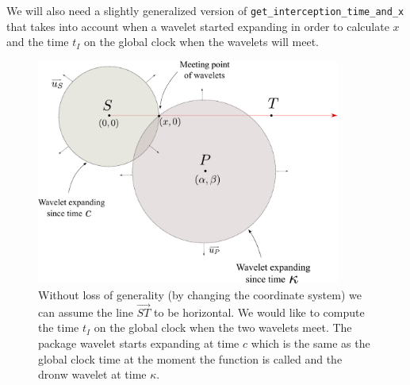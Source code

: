 \documentclass[10pt, english, oneside]{report}
\begin{document}
We will also need a slightly generalized version of \verb|get_interception_time_and_x| that takes into
account when a wavelet started expanding in order to calculate $x$ and the time $t_I$ on the global clock
when the wavelets will meet. 


\begin{figure}[H]
\centering
\includegraphics[width=10cm]{docs/get_interception_time_and_x_generalized.pdf}
\caption{Without loss of generality (by changing the coordinate system) we can assume 
         the line $\vec{ST}$ to be horizontal. We would like to compute the time $t_I$
         on the global clock when the two wavelets meet. The package wavelet starts expanding at 
         time $c$ which is the same as the global clock time at the moment the function is called 
         and the dronw wavelet at time $\kappa$.}
\end{figure}
\end{document}
